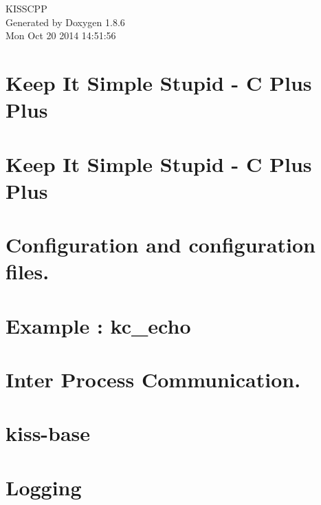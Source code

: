 \documentclass[twoside]{book}
\newcommand{\clearemptydoublepage}{%
  \newpage{\pagestyle{empty}\cleardoublepage}%
}
\begin{document}
\hypersetup{pageanchor=false}
\begin{titlepage}
\vspace*{7cm}
\begin{center}%
{\Large K\-I\-S\-S\-C\-P\-P }\\
\vspace*{1cm}
{\large Generated by Doxygen 1.8.6}\\
\vspace*{0.5cm}
{\small Mon Oct 20 2014 14:51:56}\\
\end{center}
\end{titlepage}
\clearemptydoublepage
\tableofcontents
\clearemptydoublepage
{}
\hypersetup{pageanchor=true}

\chapter{Keep It Simple Stupid -\/ C Plus Plus}
\label{index}\hypertarget{index}{}
\chapter{Keep It Simple Stupid -\/ C Plus Plus}
\label{md__r_e_a_d_m_e}
\hypertarget{md__r_e_a_d_m_e}{}

\chapter{Configuration and configuration files.}
\label{md_configuration}
\hypertarget{md_configuration}{}

\chapter{Example \-: kc\-\_\-echo}
\label{md_example_echo}
\hypertarget{md_example_echo}{}

\chapter{Inter Process Communication.}
\label{md_inter_process_communication}
\hypertarget{md_inter_process_communication}{}

\chapter{kiss-\/base}
\label{md_kiss-base}
\hypertarget{md_kiss-base}{}

\chapter{Logging}
\label{md_logging}
\hypertarget{md_logging}{}

\end{document}
